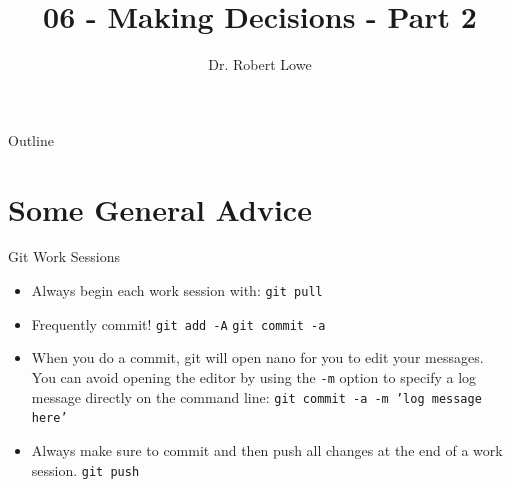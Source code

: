 \documentclass[]{beamer}
\title{06 - Making Decisions - Part 2}
\author{Dr. Robert Lowe\\}
\institute[Maryville College] %
{
    Division of Mathematics and Computer Science\\
    Maryville College
}
\date[]{}
\begin{document}
\begin{frame}
  \titlepage
\end{frame}

\begin{frame}{Outline}
  \tableofcontents
\end{frame}





\section{Some General Advice}

\begin{frame}{Git Work Sessions}
  \begin{itemize}[<+->]
      \item Always begin each work session with:
        \newline\texttt{git pull}
      \item Frequently commit!
        \newline\texttt{git add -A}
        \newline\texttt{git commit -a}
      \item When you do a commit, git will open nano for you to
        edit your messages.  You can avoid opening the editor by
        using the \texttt{-m} option to specify a log message
        directly on the command line:
        \newline\texttt{git commit -a -m 'log message here'}
      \item Always make sure to commit and then push all changes
        at the end of a work session.
        \newline\texttt{git push}
  \end{itemize}
\end{frame}
\end{document}
